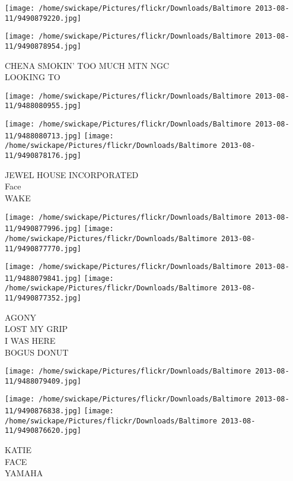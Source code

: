\documentclass[10pt,letterpaper]{article}
\begin{document}
\texttt{[image: /home/swickape/Pictures/flickr/Downloads/Baltimore 2013-08-11/9490879220.jpg]}

\vspace{0.25in}
\texttt{[image: /home/swickape/Pictures/flickr/Downloads/Baltimore 2013-08-11/9490878954.jpg]}

CHENA SMOKIN' TOO MUCH MTN NGC\\
LOOKING TO\\
\pagebreak

\texttt{[image: /home/swickape/Pictures/flickr/Downloads/Baltimore 2013-08-11/9488080955.jpg]}

\vspace{0.25in}
\texttt{[image: /home/swickape/Pictures/flickr/Downloads/Baltimore 2013-08-11/9488080713.jpg]}
\texttt{[image: /home/swickape/Pictures/flickr/Downloads/Baltimore 2013-08-11/9490878176.jpg]}

JEWEL HOUSE INCORPORATED\\
Face\\
WAKE\\
\pagebreak

\texttt{[image: /home/swickape/Pictures/flickr/Downloads/Baltimore 2013-08-11/9490877996.jpg]}
\texttt{[image: /home/swickape/Pictures/flickr/Downloads/Baltimore 2013-08-11/9490877770.jpg]}

\texttt{[image: /home/swickape/Pictures/flickr/Downloads/Baltimore 2013-08-11/9488079841.jpg]}
\texttt{[image: /home/swickape/Pictures/flickr/Downloads/Baltimore 2013-08-11/9490877352.jpg]}

AGONY\\
LOST MY GRIP\\
I WAS HERE\\
BOGUS DONUT\\
\pagebreak

\texttt{[image: /home/swickape/Pictures/flickr/Downloads/Baltimore 2013-08-11/9488079409.jpg]}

\vspace{0.25in}
\texttt{[image: /home/swickape/Pictures/flickr/Downloads/Baltimore 2013-08-11/9490876838.jpg]}
\texttt{[image: /home/swickape/Pictures/flickr/Downloads/Baltimore 2013-08-11/9490876620.jpg]}

KATIE\\
FACE\\
YAMAHA\\
\pagebreak
\end{document}
